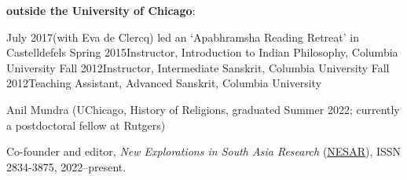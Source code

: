 \documentclass{scrartcl}
\begin{document}
\textbf{outside the University of Chicago}:

\begin{entrylist}
\singleentry
{July 2017}{(with Eva de Clercq) led an ‘Apabhramsha Reading Retreat’ in Castelldefels}
\singleentry
{Spring 2015}{Instructor, Introduction to Indian Philosophy, Columbia University}
\singleentry
{Fall 2012}{Instructor, Intermediate Sanskrit, Columbia University}
\singleentry
{Fall 2012}{Teaching Assistant, Advanced Sanskrit, Columbia University}
\end{entrylist} 


Anil Mundra (UChicago, History of Religions, graduated Summer 2022; currently a postdoctoral fellow at Rutgers)\bigskip


Co-founder and editor, \emph{New Explorations in South Asia Research} (\href{https://nesarjournal.org}{NESAR}), ISSN 2834-3875, 2022–present.\smallskip

\vfill
\vspace{-4cm}
\end{document}

